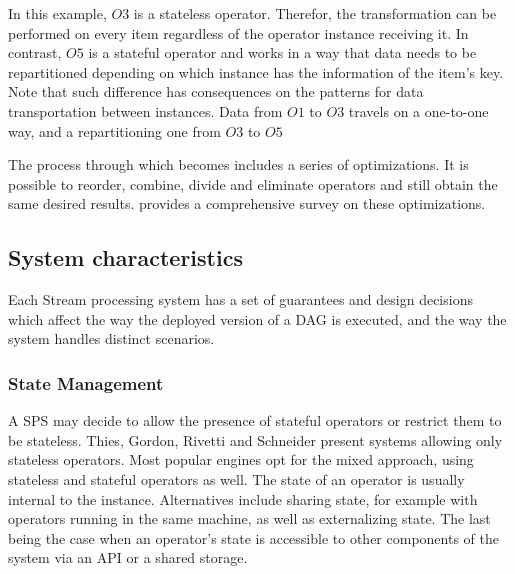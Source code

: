 
  In this example, $O3$ is a stateless operator. Therefor, the transformation
  can be performed on every item regardless of the operator instance receiving
  it. In contrast, $O5$ is a stateful operator and works in a way that data
  needs to be repartitioned depending on which instance has the information of
  the item's key. Note that such difference has consequences on the patterns
  for data transportation between instances. Data from $O1$ to $O3$ travels on
  a one-to-one way, and a repartitioning one from $O3$ to $O5$

  The process through which  becomes 
  includes a series of optimizations. It is possible to reorder, combine,
  divide and eliminate operators and still obtain the same desired results.
  \cite{Hirzel_2014} provides a comprehensive survey on these optimizations.

  \subsection{System characteristics}%

  Each Stream processing system has a set of guarantees and design decisions which affect the way the deployed version of a DAG is executed, and the way the system handles distinct scenarios.


  \subsubsection{State Management}%
   A SPS may decide to allow the presence of stateful operators or restrict them to be stateless. Thies, Gordon, Rivetti and Schneider present systems allowing only stateless operators. Most popular engines opt for the mixed approach, using stateless and stateful operators as well. The state of an operator is usually internal to the instance. Alternatives include sharing state, for example with operators running in the same machine, as well as externalizing state. The last being the case when an operator's state is accessible to other components of the system via an API or a shared storage.


